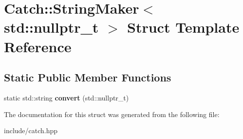 \hypertarget{structCatch_1_1StringMaker_3_01std_1_1nullptr__t_01_4}{}\section{Catch\+:\+:String\+Maker$<$ std\+:\+:nullptr\+\_\+t $>$ Struct Template Reference}
\label{structCatch_1_1StringMaker_3_01std_1_1nullptr__t_01_4}
\subsection*{Static Public Member Functions}
\begin{DoxyCompactItemize}
\item 
static std\+::string {\bfseries convert} (std\+::nullptr\+\_\+t)\hypertarget{structCatch_1_1StringMaker_3_01std_1_1nullptr__t_01_4_a131fbb1f5cd68c93aaf30d34e3519e9c}{}\label{structCatch_1_1StringMaker_3_01std_1_1nullptr__t_01_4_a131fbb1f5cd68c93aaf30d34e3519e9c}

\end{DoxyCompactItemize}


The documentation for this struct was generated from the following file\+:\begin{DoxyCompactItemize}
\item 
include/catch.\+hpp\end{DoxyCompactItemize}
